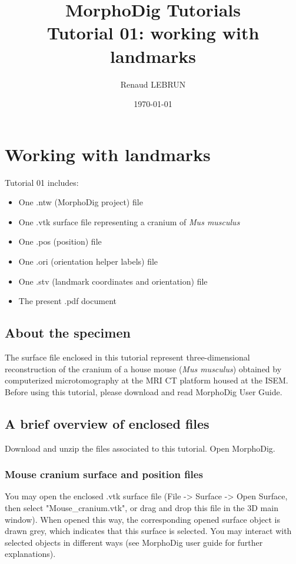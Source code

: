 \documentclass[12pt, a4paper]{book}
\title{MorphoDig Tutorials\\Tutorial 01: working with landmarks}
\author{Renaud LEBRUN}
\affil{Institut des Sciences de l'Evolution, Université de Montpellier, France}
\date{\today}
\begin{document}
	\dominitoc

\maketitle


\tableofcontents

\chapter{Working with landmarks}


\minitoc 
Tutorial 01 includes:
\begin{itemize}
\item One .ntw (MorphoDig project) file
\item One .vtk surface file representing a cranium of \textit{Mus musculus}
\item One .pos (position) file 
\item One .ori (orientation helper labels) file 
\item One .stv (landmark coordinates and orientation) file
\item The present .pdf document
\end{itemize}





\section{About the specimen}

The surface file enclosed in this tutorial represent three-dimensional reconstruction of the cranium of a house mouse (\textit{Mus musculus}) obtained by computerized microtomography at the MRI \si{\micro} CT platform housed at the ISEM.
Before using this tutorial, please download and read MorphoDig User Guide.


\section{A brief overview of enclosed files}
		Download and unzip the files associated to this tutorial. Open MorphoDig.
\subsection{Mouse cranium surface and position files}
	You may open the enclosed .vtk surface file (File -> Surface -> Open Surface, then select "Mouse\_cranium.vtk", or drag and drop this file in the 3D main window). When opened
this way, the corresponding opened surface object is drawn grey, which indicates that this surface
is selected. You may interact with selected objects in different ways (see MorphoDig user guide for
further explanations).\\
\end{document}
